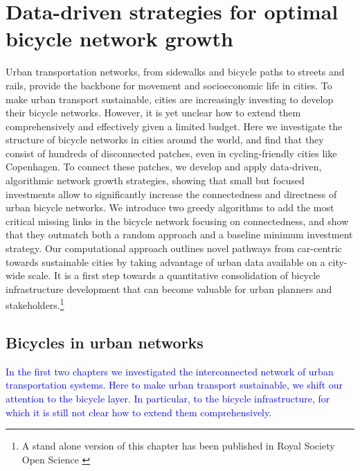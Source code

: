 \chapter{Data-driven strategies for optimal bicycle network growth}\label{ch:BikeGrowth}

Urban transportation networks, from sidewalks and bicycle paths to streets and rails, provide the backbone for movement and socioeconomic life in cities. To make urban transport sustainable, cities are increasingly investing to develop their bicycle networks. However, it is yet unclear how to extend them comprehensively and effectively given a limited budget. Here we investigate the structure of bicycle networks in cities around the world, and find that they consist of hundreds of disconnected patches, even in cycling-friendly cities like Copenhagen. To connect these patches, we develop and apply data-driven, algorithmic network growth strategies, showing that small but focused investments allow to significantly increase the connectedness and directness of urban bicycle networks. We introduce two greedy algorithms to add the most critical missing links in the bicycle network focusing on connectedness, and show that they outmatch both a random approach and a baseline minimum investment strategy. Our computational approach outlines novel pathways from car-centric towards sustainable cities by taking advantage of urban data available on a city-wide scale. It is a first step towards a quantitative consolidation of bicycle infrastructure development that can become valuable for urban planners and stakeholders.\footnote{A stand alone version of this chapter has been published in Royal Society Open Science \cite{natera2020growth}}
\pagebreak

\section{Bicycles in urban networks}
\textcolor{blue}{In the first two chapters we investigated the interconnected network of urban transportation systems. Here to make urban transport sustainable, we shift our attention to the bicycle layer. In particular, to the bicycle infrastructure, for which it is still not clear how to extend them comprehensively.}

